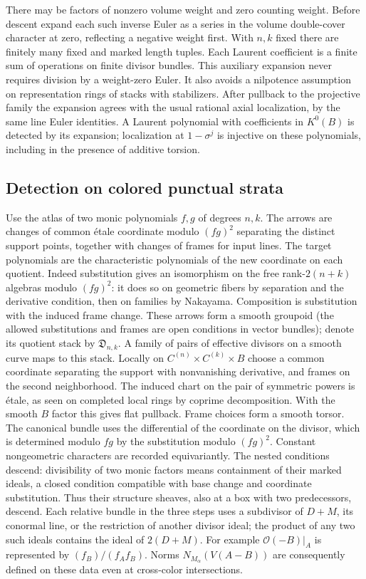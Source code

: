 There may be factors of nonzero volume weight and zero counting weight. Before descent expand each such inverse Euler as a series in the volume double-cover character at zero, reflecting a negative weight first. With $n,k$ fixed there are finitely many fixed and marked length tuples. Each Laurent coefficient is a finite sum of operations on finite divisor bundles. This auxiliary expansion never requires division by a weight-zero Euler. It also avoids a nilpotence assumption on representation rings of stacks with stabilizers. After pullback to the projective family the expansion agrees with the usual rational axial localization, by the same line Euler identities. A Laurent polynomial with coefficients in $K^0(B)$ is detected by its expansion; localization at $1-\sigma^j$ is injective on these polynomials, including in the presence of additive torsion.

\subsection{Detection on colored punctual strata}

Use the atlas of two monic polynomials $f,g$ of degrees $n,k$. The arrows are changes of common \'etale coordinate modulo $(fg)^2$ separating the distinct support points, together with changes of frames for input lines. The target polynomials are the characteristic polynomials of the new coordinate on each quotient. Indeed substitution gives an isomorphism on the free rank-$2(n+k)$ algebras modulo $(fg)^2$: it does so on geometric fibers by separation and the derivative condition, then on families by Nakayama. Composition is substitution with the induced frame change. These arrows form a smooth groupoid (the allowed substitutions and frames are open conditions in vector bundles); denote its quotient stack by $\mathfrak D_{n,k}$. A family of pairs of effective divisors on a smooth curve maps to this stack. Locally on $C^{(n)}\times C^{(k)}\times B$ choose a common coordinate separating the support with nonvanishing derivative, and frames on the second neighborhood. The induced chart on the pair of symmetric powers is \'etale, as seen on completed local rings by coprime decomposition. With the smooth $B$ factor this gives flat pullback. Frame choices form a smooth torsor. The canonical bundle uses the differential of the coordinate on the divisor, which is determined modulo $fg$ by the substitution modulo $(fg)^2$. Constant nongeometric characters are recorded equivariantly. The nested conditions descend: divisibility of two monic factors means containment of their marked ideals, a closed condition compatible with base change and coordinate substitution. Thus their structure sheaves, also at a box with two predecessors, descend. Each relative bundle in the three steps uses a subdivisor of $D+M$, its conormal line, or the restriction of another divisor ideal; the product of any two such ideals contains the ideal of $2(D+M)$. For example $\mathcal O(-B)|_A$ is represented by $(f_B)/(f_Af_B)$. Norms $N_{M_\alpha}(V(A-B))$ are consequently defined on these data even at cross-color intersections.

